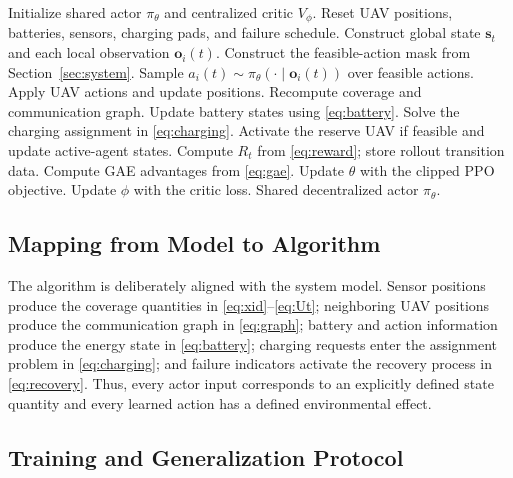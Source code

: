 \documentclass[conference]{IEEEtran}
\begin{document}
\begin{algorithm}[t]
\caption{MAPPO training algorithm}
\label{alg:training}
\begin{algorithmic}[1]
\STATE Initialize shared actor $\pi_\theta$ and centralized critic $V_\phi$.
    \STATE Reset UAV positions, batteries, sensors, charging pads, and failure schedule.
        \STATE Construct global state $\mathbf s_t$ and each local observation $\mathbf o_i(t)$.
            \STATE Construct the feasible-action mask from Section~\ref{sec:system}.
            \STATE Sample $a_i(t)\sim\pi_\theta(\cdot\mid\mathbf o_i(t))$ over feasible actions.
        \ENDFOR
        \STATE Apply UAV actions and update positions.
        \STATE Recompute coverage and communication graph.
        \STATE Update battery states using \eqref{eq:battery}.
            \STATE Solve the charging assignment in \eqref{eq:charging}.
        \ENDIF
            \STATE Activate the reserve UAV if feasible and update active-agent states.
        \ENDIF
        \STATE Compute $R_t$ from \eqref{eq:reward}; store rollout transition data.
    \ENDFOR
    \STATE Compute GAE advantages from \eqref{eq:gae}.
    \STATE Update $\theta$ with the clipped PPO objective.
    \STATE Update $\phi$ with the critic loss.
\ENDFOR
\RETURN Shared decentralized actor $\pi_\theta$.
\end{algorithmic}
\end{algorithm}

\subsection{Mapping from Model to Algorithm}
The algorithm is deliberately aligned with the system model. Sensor positions produce the coverage quantities in \eqref{eq:xid}--\eqref{eq:Ut}; neighboring UAV positions produce the communication graph in \eqref{eq:graph}; battery and action information produce the energy state in \eqref{eq:battery}; charging requests enter the assignment problem in \eqref{eq:charging}; and failure indicators activate the recovery process in \eqref{eq:recovery}. Thus, every actor input corresponds to an explicitly defined state quantity and every learned action has a defined environmental effect.

\subsection{Training and Generalization Protocol}
\label{sec:protocol}
\end{document}
